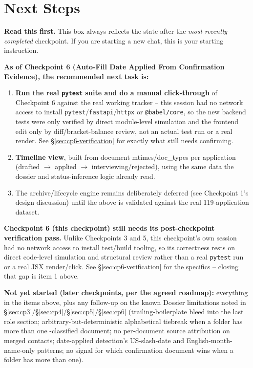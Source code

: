 \documentclass[11pt]{article}
\newcommand{\cmd}[1]{\texttt{\detokenize{#1}}}
\begin{document}
\section{Next Steps}\label{sec:next-steps}

\begin{warningbox}
\textbf{Read this first.} This box always reflects the state after the \emph{most recently completed} checkpoint. If you are starting a new chat, this is your starting instruction.
\end{warningbox}

\textbf{As of Checkpoint 6 (Auto-Fill Date Applied From Confirmation Evidence), the recommended next task is:}

\begin{enumerate}
  \item \textbf{Run the real \texttt{pytest} suite and do a manual click-through} of Checkpoint 6 against the real working tracker -- this session had no network access to install \texttt{pytest}/\texttt{fastapi}/\texttt{httpx} or \texttt{@babel/core}, so the new backend tests were only verified by direct module-level simulation and the frontend edit only by diff/bracket-balance review, not an actual test run or a real render. See \S\ref{sec:cp6-verification} for exactly what still needs confirming.
  \item \textbf{Timeline view}, built from document mtimes/doc\_types per application (drafted $\to$ applied $\to$ interviewing/rejected), using the same \cmd{effective\_doc\_type} data the dossier and status-inference logic already read.
  \item The archive/lifecycle engine remains deliberately deferred (see Checkpoint 1's design discussion) until the above is validated against the real 119-application dataset.
\end{enumerate}

\textbf{Checkpoint 6 (this checkpoint) still needs its post-checkpoint verification pass.} Unlike Checkpoints 3 and 5, this checkpoint's own session had no network access to install test/build tooling, so its correctness rests on direct code-level simulation and structural review rather than a real \texttt{pytest} run or a real JSX render/click. See \S\ref{sec:cp6-verification} for the specifics -- closing that gap is item 1 above.

\textbf{Not yet started (later checkpoints, per the agreed roadmap):} everything in the items above, plus any follow-up on the known Dossier limitations noted in \S\ref{sec:cp3}/\S\ref{sec:cp4}/\S\ref{sec:cp5}/\S\ref{sec:cp6} (trailing-boilerplate bleed into the last role section; arbitrary-but-deterministic alphabetical tiebreak when a folder has more than one \cmd{job\_posting}-classified document; no per-document source attribution on merged contacts; date-applied detection's US-slash-date and English-month-name-only patterns; no signal for which confirmation document wins when a folder has more than one).
\end{document}
